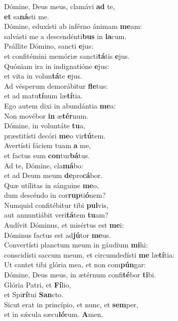 \evenverse Dómine, Deus meus, clamávi \textbf{ad} te,~\*\\
\evenverse \textbf{et} sa\textbf{ná}sti me.\\
\oddverse Dómine, eduxísti ab inférno ánimam \textbf{me}am:~\*\\
\oddverse salvásti me a descendénti\textbf{bus} in \textbf{la}cum.\\
\evenverse Psállite Dómino, sancti \textbf{e}jus:~\*\\
\evenverse et confitémini memóriæ sancti\textbf{tá}tis \textbf{e}jus.\\
\oddverse Quóniam ira in indignatióne \textbf{e}jus:~\*\\
\oddverse et vita in volun\textbf{tá}te \textbf{e}jus.\\
\evenverse Ad vésperum demorábitur \textbf{fle}tus:~\*\\
\evenverse et ad matu\textbf{tí}num læ\textbf{tí}tia.\\
\oddverse Ego autem dixi in abundántia \textbf{me}a:~\*\\
\oddverse Non movébor \textbf{in} æ\textbf{tér}num.\\
\evenverse Dómine, in voluntáte \textbf{tu}a,~\*\\
\evenverse præstitísti decóri \textbf{me}o vir\textbf{tú}tem.\\
\oddverse Avertísti fáciem tuam \textbf{a} me,~\*\\
\oddverse et factus sum \textbf{con}tur\textbf{bá}tus.\\
\evenverse Ad te, Dómine, cla\textbf{má}bo:~\*\\
\evenverse et ad Deum meum \textbf{de}pre\textbf{cá}bor.\\
\oddverse Quæ utílitas in sánguine \textbf{me}o,~\*\\
\oddverse dum descéndo in cor\textbf{rup}ti\textbf{ó}nem?\\
\evenverse Numquid confitébitur tibi \textbf{pul}vis,~\*\\
\evenverse aut annuntiábit veri\textbf{tá}tem \textbf{tu}am?\\
\oddverse Audívit Dóminus, et misértus est \textbf{me}i:~\*\\
\oddverse Dóminus factus est ad\textbf{jú}tor \textbf{me}us.\\
\evenverse Convertísti planctum meum in gáudium \textbf{mi}hi:~\*\\
\evenverse conscidísti saccum meum, et circumdedísti \textbf{me} læ\textbf{tí}tia:\\
\oddverse Ut cantet tibi glória mea, et non com\textbf{pún}gar:~\*\\
\oddverse Dómine, Deus meus, in ætérnum confi\textbf{té}bor \textbf{ti}bi.\\
\evenverse Glória Patri, et \textbf{Fí}lio,~\*\\
\evenverse et Spi\textbf{rí}tui \textbf{San}cto.\\
\oddverse Sicut erat in princípio, et nunc, et \textbf{sem}per,~\*\\
\oddverse et in sǽcula sæcu\textbf{ló}rum. \textbf{A}men.\\
